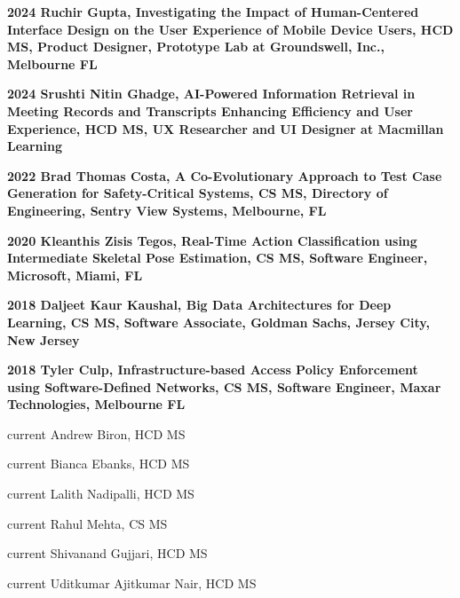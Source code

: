 \documentclass[12pt,letterpaper]{report}
\newcommand{\listitemspace}{0.25em}
\renewenvironment{itemize}
{\begin{list}{}{\setlength{\leftmargin}{0em}
                \setlength{\parskip}{0em}
                \setlength{\itemsep}{\listitemspace}
                \setlength{\parsep}{\listitemspace}}}
{\end{list}}
\begin{document}
    \begin{itemize}
        \item \textbf{2024 Ruchir Gupta, Investigating the Impact of Human-Centered Interface Design on the User Experience of Mobile Device Users, HCD MS, Product Designer, Prototype Lab at Groundswell, Inc., Melbourne FL}
        \item \textbf{2024 Srushti Nitin Ghadge, AI-Powered Information Retrieval in Meeting Records and Transcripts
Enhancing Efficiency and User Experience, HCD MS, UX Researcher and UI Designer at Macmillan Learning}        
        \item \textbf{2022 Brad Thomas Costa, A Co-Evolutionary Approach to Test Case Generation for Safety-Critical Systems, CS MS, Directory of Engineering, Sentry View Systems, Melbourne, FL}
        \item \textbf{2020 Kleanthis Zisis Tegos, Real-Time Action Classification using Intermediate Skeletal Pose Estimation, CS MS, Software Engineer, Microsoft, Miami, FL}
        \item \textbf{2018 Daljeet Kaur Kaushal, Big Data Architectures for Deep Learning, CS MS, Software Associate, Goldman Sachs, Jersey City, New Jersey}
        \item \textbf{2018 Tyler Culp, Infrastructure-based Access Policy Enforcement using Software-Defined Networks, CS MS, Software Engineer, Maxar Technologies, Melbourne FL}
        \item current Andrew Biron, HCD MS
        \item current Bianca Ebanks, HCD MS
        \item current Lalith Nadipalli, HCD MS
        \item current Rahul Mehta, CS MS
        \item current Shivanand Gujjari, HCD MS
        \item current Uditkumar Ajitkumar Nair, HCD MS
    \end{itemize}
\end{document}
